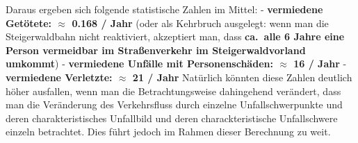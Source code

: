 \documentclass[fontsize=12pt,a4paper]{scrreprt}
\begin{document}
Daraus ergeben sich folgende statistische Zahlen im Mittel:\newline
\newline
- \textbf{vermiedene Getötete: \(\approx\) 0.168 / Jahr} (oder als Kehrbruch ausgelegt: wenn man die Steigerwaldbahn nicht reaktiviert, akzeptiert man, dass \textbf{ca.\ alle 6 Jahre eine Person vermeidbar im Straßenverkehr im Steigerwaldvorland umkommt})\newline
- \textbf{vermiedene Unfälle mit Personenschäden: \(\approx\) 16 / Jahr}\newline
- \textbf{vermiedene Verletzte: \(\approx\) 21 / Jahr}\newline
\newline
Natürlich könnten diese Zahlen deutlich höher ausfallen, wenn man die Betrachtungsweise dahingehend verändert, dass man die Veränderung des Verkehrsfluss durch einzelne Unfallschwerpunkte und deren charakteristisches Unfallbild und deren charackteristische Unfallschwere einzeln betrachtet. Dies führt jedoch im Rahmen dieser Berechnung zu weit.
\end{document}

